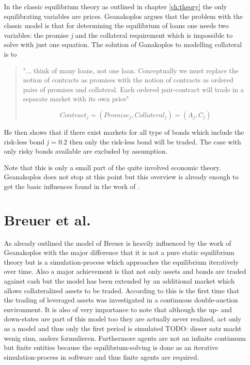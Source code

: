 \documentclass[../Bachelorarbeit.tex]{subfiles}
\begin{document}
\medskip

In the classic equilibrium theory as outlined in chapter \ref{ch:theory} the only equilibrating variables are prices. Geanakoplos argues that the problem with the classic model is that for determining the equilibrium of loans one needs two variables: the promise \textit{j} and the collateral requirement which is impossible to solve with just one equation.
The solution of Ganakoplos to modelling collateral is to

\begin{quote}
"... think of many loans, not one loan. Conceptually we must replace the notion of contracts as promises with the notion of contracts as ordered pairs of promises and collateral. Each ordered pair-contract will trade in a separate market with its own price"

\begin{equation}
Contract_j = (Promise_j, Collateral_j) = (A_j, C_j)
\end{equation}
\end{quote}

He then shows that if there exist markets for all type of bonds which include the risk-less bond \textit{j} = 0.2 then only the risk-less bond will be traded. The case with only risky bonds available are excluded by assumption.

\medskip

Note that this is only a small part of the quite involved economic theory. Geanakoplos does not stop at this point but this overview is already enough to get the basic influences found in the work of \cite{Breuer2015}.

\section{Breuer et al.}
As already outlined the model of Breuer is heavily influenced by the work of Geanakoplos with the major difference that it is not a pure static equilibrium theory but is a simulation-process which approaches the equilibrium iteratively over time. Also a major achievement is that not only assets and bonds are traded against cash but the model has been extended by an additional market which allows collateralized assets to be traded. According to \cite{Breuer2015} this is the first time that the trading of leveraged assets was investigated in a continuous double-auction environment. It is also of very importance to note that although the up- and down-states are part of this model too they are actually never realized, act only as a model and thus only the first period is simulated TODO: dieser satz macht wenig sinn, anders formulieren. Furthermore agents are not an infinite continuum but finite entities because the equilibrium-solving is done as an iterative simulation-process in software and thus finite agents are required.
\end{document}

